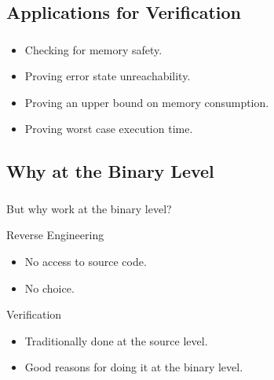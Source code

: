 \documentclass[compress]{beamer}
\begin{document}
\subsection{Applications for Verification}
\begin{frame}[fragile]
	\frametitle{\insertsubsection}

	\begin{itemize}
		\vfill
	\item Checking for memory safety.
		\vfill
	\item Proving error state unreachability.
		\vfill
	\item Proving an upper bound on memory consumption.
		\vfill
	\item Proving worst case execution time.
		\vfill
	\end{itemize}

\end{frame}


\subsection{Why at the Binary Level}
\begin{frame}[fragile]
	\frametitle{\insertsubsection}

	But why work at the binary level?
	\vfill

	\begin{block}{Reverse Engineering}
		\begin{itemize}
		\item No access to source code.
		\item No choice.
		\end{itemize}
	\end{block}

	\vfill

	\begin{block}{Verification}
		\begin{itemize}
		\item Traditionally done at the source level.
		\item Good reasons for doing it at the binary level.
		\end{itemize}
	\end{block}

\end{frame}
\end{document}
